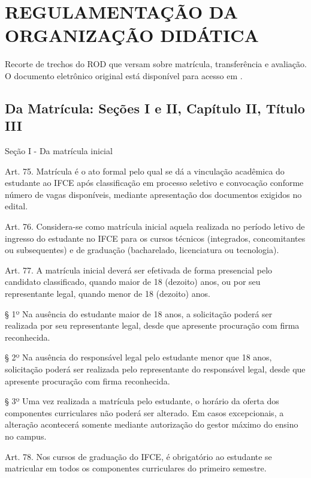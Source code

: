\clearpage\section{REGULAMENTAÇÃO DA ORGANIZAÇÃO DIDÁTICA}
\label{anexoROD}

Recorte de trechos do ROD que versam sobre matrícula, transferência e avaliação. O documento eletrônico original está disponível para acesso em .

{\scriptsize 
\subsection*{\footnotesize  Da Matrícula: Seções I e II, Capítulo II, Título III}
\label{anexoRODmatricula}

\begin{center}
	Seção I - Da matrícula inicial
\end{center}

Art. 75. Matrícula é o ato formal pelo qual se dá a vinculação acadêmica do estudante ao IFCE após classificação em processo seletivo e convocação conforme número de vagas disponíveis, mediante apresentação dos documentos exigidos no edital.

Art. 76. Considera-se como matrícula inicial aquela realizada no período letivo de ingresso do estudante no IFCE para os cursos técnicos (integrados, concomitantes ou subsequentes) e de graduação (bacharelado, licenciatura ou tecnologia).

Art. 77. A matrícula inicial deverá ser efetivada de forma presencial pelo candidato classificado, quando maior de 18 (dezoito) anos, ou por seu representante legal, quando menor de 18 (dezoito) anos.

§ 1º Na ausência do estudante maior de 18 anos, a solicitação poderá ser realizada por seu representante legal, desde que apresente procuração com firma reconhecida.

§ 2º Na ausência do responsável legal pelo estudante menor que 18 anos, solicitação poderá ser realizada pelo representante do responsável legal, desde que apresente procuração com firma reconhecida.

§ 3º Uma vez realizada a matrícula pelo estudante, o horário da oferta dos componentes curriculares não poderá ser alterado. Em casos excepcionais, a alteração acontecerá somente mediante autorização do gestor máximo do ensino no campus.

Art. 78. Nos cursos de graduação do IFCE, é obrigatório ao estudante se matricular em todos os componentes curriculares do primeiro semestre.

}
